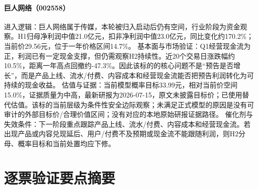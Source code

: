 \paragraph{巨人网络（002558）}
进入逻辑：巨人网络属于传媒，本轮被归入启动后仍有空间，行业阶段为资金观察。H1归母净利润中值21.0亿元，扣非净利润中值23.0亿元，同比变化约170.2\%；当前价29.56元，位于一年价格区间14.7\%。
基本面与市场验证：Q1经营现金流为正，利润已有一定现金支撑，但仍需观察H2持续性。近20个交易日涨跌幅约10.5\%，距离一年高点回撤约-47.3\%。因此该标的的核心问题不是“预告是否增长”，而是产品上线、流水/付费、内容成本和经营现金流能否把预告利润转化为可持续的现金收益。
估值与证据：当前模型概率目标33.99元，相对当前价空间15.0\%，证据质量为中高，最新研报为2026-07-15，原文未披露目标价；已使用替代估值。该标的当前层级为条件性安全边际观察；未满足正式模型的原因是没有可审计的外部目标价/合理价值区间；没有对应的本地原始研报证据路径。
催化剂与失效条件：下一阶段重点跟踪产品上线、流水/付费、内容成本和经营现金流。若出现产品或内容兑现延后、用户/付费不及预期或现金流不能跟随利润，则H2分母、概率目标和当前处置均应下修。

\section{逐票验证要点摘要}

